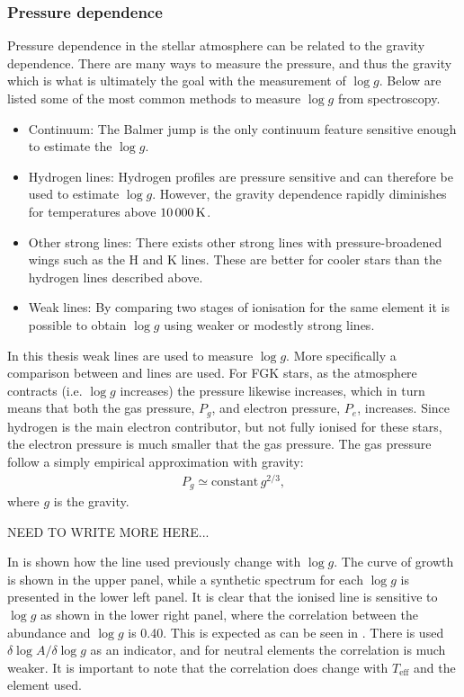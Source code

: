 \subsubsection{Pressure dependence}

Pressure dependence in the stellar atmosphere can be related to the gravity
dependence. There are many ways to measure the pressure, and thus the gravity
which is what is ultimately the goal with the measurement of $\log g$. Below are
listed some of the most common methods to measure $\log g$ from spectroscopy.

\begin{itemize}
  \item Continuum: The Balmer jump is the only continuum feature sensitive
        enough to estimate the $\log g$.
  \item Hydrogen lines: Hydrogen profiles are pressure sensitive and can
        therefore be used to estimate $\log g$. However, the gravity dependence
        rapidly diminishes for temperatures above $\SI{10\,000}{K}$.
  \item Other strong lines: There exists other strong lines with
        pressure-broadened wings such as the  H and K lines. These
        are better for cooler stars than the hydrogen lines described above.
  \item Weak lines: By comparing two stages of ionisation for the same element
        it is possible to obtain $\log g$ using weaker or modestly strong lines.
\end{itemize}
In this thesis weak lines are used to measure $\log g$. More specifically a
comparison between  and  lines are used. For FGK stars,
as the atmosphere contracts (i.e. $\log g$ increases) the pressure likewise
increases, which in turn means that both the gas pressure, $P_g$, and electron
pressure, $P_e$, increases. Since hydrogen is the main electron contributor, but
not fully ionised for these stars, the electron pressure is much smaller that
the gas pressure. The gas pressure follow a simply empirical approximation with
gravity:
\begin{align}
  P_g \simeq \mathrm{constant}\, g^{2/3},
\end{align}
where $g$ is the gravity.

NEED TO WRITE MORE HERE...

In  is shown how the  line used previously
change with $\log g$. The curve of growth is shown in the upper panel, while a
synthetic spectrum for each $\log g$ is presented in the lower left panel. It is
clear that the ionised line is sensitive to $\log g$ as shown in the lower right
panel, where the correlation between the abundance and $\log g$ is 0.40. This is
expected as can be seen in \citet[][Table 16.1]{Gray2006}. There is used
$\delta\log A/\delta\log g$ as an indicator, and for neutral elements the
correlation is much weaker. It is important to note that the correlation does
change with $T_\mathrm{eff}$ and the element used.


